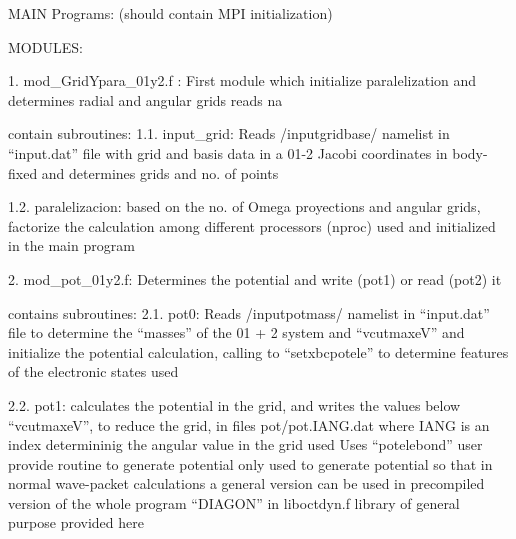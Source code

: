 
MAIN Programs: (should contain MPI initialization)
   

MODULES:

1. mod_GridYpara_01y2.f :  First module which initialize paralelization and determines radial and angular grids
                          reads na
         
         contain subroutines:
                                  1.1. input_grid:  Reads /inputgridbase/ namelist in ``input.dat'' file
                                                   with grid and basis data in a 01-2 Jacobi coordinates in body-fixed
                                                   and determines grids and no. of points

                                  1.2. paralelizacion: based on the no. of Omega proyections
                                                   and angular grids, factorize the calculation
                                                   among different processors (nproc) used and initialized
                                                   in the main program
                       
2. mod_pot_01y2.f: Determines the potential and write (pot1) or read (pot2) it

          contains subroutines:
                                  2.1. pot0:  Reads /inputpotmass/ namelist in ``input.dat'' file
                                             to determine the ``masses'' of the 01 + 2 system and ``vcutmaxeV''
                                             and initialize the potential calculation, calling to
                                                               ``setxbcpotele''
                                             to determine features of the electronic states used

                                  2.2. pot1: calculates the potential in the grid, and writes the values
                                             below ``vcutmaxeV'', to reduce the grid, in files pot/pot.IANG.dat
                                             where IANG is an index determininig the angular value in the grid used
                                             Uses
                                                              ``potelebond'' user provide routine to generate potential
                                                                             only used to generate potential
                                                                             so that in normal wave-packet calculations
                                                                             a general version can be used in precompiled 
                                                                             version of the whole program
                                                              ``DIAGON'' in liboctdyn.f library of general purpose provided here
            
